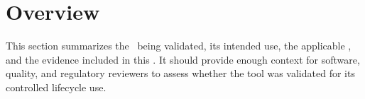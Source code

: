 \section{Overview}
This section summarizes the \stdCfgItem\ being validated, its intended use, the
applicable \stdIUR, and the evidence included in this \stdRptPkg.  It should
provide enough context for software, quality, and regulatory reviewers to assess
whether the tool was validated for its controlled lifecycle use.
